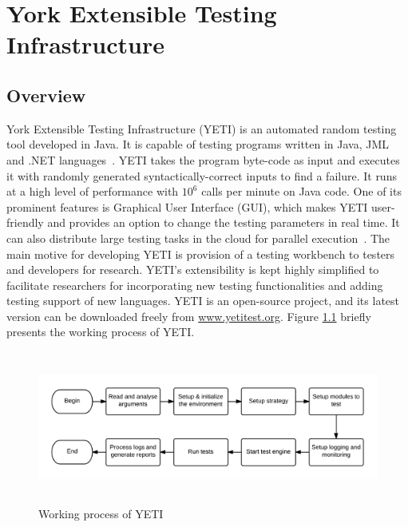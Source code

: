 
\chapter{York Extensible Testing Infrastructure}
\label{chap:yeti_3}





\section{Overview}
York Extensible Testing Infrastructure (YETI) is an automated random testing tool developed in Java. It is capable of testing programs written in Java, JML and .NET languages~\cite{oriol2010testing}. YETI takes the program byte-code as input and executes it with randomly generated syntactically-correct inputs to find a failure. It runs at a high level of performance with $10^6$ calls per minute on Java code. One of its prominent features is Graphical User Interface (GUI), which makes YETI user-friendly and provides an option to change the testing parameters in real time. It can also distribute large testing tasks in the cloud for parallel execution~\cite{oriol2010yeti}. The main motive for developing YETI is provision of a testing workbench to testers and developers for research. YETI's extensibility is kept highly simplified to facilitate researchers for incorporating new testing functionalities and adding testing support of new languages. YETI is an open-source project, and its latest version can be downloaded freely from \url{www.yetitest.org}. Figure \ref{fig:yetiOverview} briefly presents the working process of YETI. 

\begin{figure}[h]
	\centering
	\includegraphics[width=15.3cm, height=5cm]{chapter3/workingProcess.png}
	\bigskip
	\caption{Working process of YETI}
	\label{fig:yetiOverview}
\end{figure}


